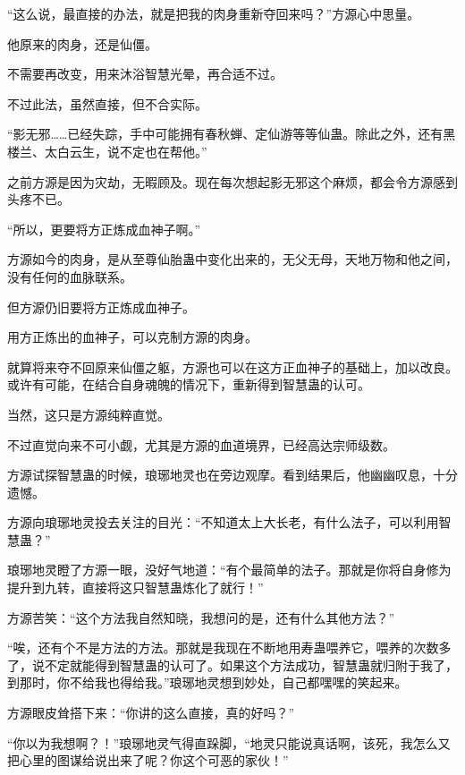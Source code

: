\begin{this_body}
“这么说，最直接的办法，就是把我的肉身重新夺回来吗？”方源心中思量。

他原来的肉身，还是仙僵。

不需要再改变，用来沐浴智慧光晕，再合适不过。

不过此法，虽然直接，但不合实际。

“影无邪……已经失踪，手中可能拥有春秋蝉、定仙游等等仙蛊。除此之外，还有黑楼兰、太白云生，说不定也在帮他。”

之前方源是因为灾劫，无暇顾及。现在每次想起影无邪这个麻烦，都会令方源感到头疼不已。

“所以，更要将方正炼成血神子啊。”

方源如今的肉身，是从至尊仙胎蛊中变化出来的，无父无母，天地万物和他之间，没有任何的血脉联系。

但方源仍旧要将方正炼成血神子。

用方正炼出的血神子，可以克制方源的肉身。

就算将来夺不回原来仙僵之躯，方源也可以在这方正血神子的基础上，加以改良。或许有可能，在结合自身魂魄的情况下，重新得到智慧蛊的认可。

当然，这只是方源纯粹直觉。

不过直觉向来不可小觑，尤其是方源的血道境界，已经高达宗师级数。

方源试探智慧蛊的时候，琅琊地灵也在旁边观摩。看到结果后，他幽幽叹息，十分遗憾。

方源向琅琊地灵投去关注的目光：“不知道太上大长老，有什么法子，可以利用智慧蛊？”

琅琊地灵瞪了方源一眼，没好气地道：“有个最简单的法子。那就是你将自身修为提升到九转，直接将这只智慧蛊炼化了就行！”

方源苦笑：“这个方法我自然知晓，我想问的是，还有什么其他方法？”

“唉，还有个不是方法的方法。那就是我现在不断地用寿蛊喂养它，喂养的次数多了，说不定就能得到智慧蛊的认可了。如果这个方法成功，智慧蛊就归附于我了，到那时，你不给我也得给我。”琅琊地灵想到妙处，自己都嘿嘿的笑起来。

方源眼皮耸搭下来：“你讲的这么直接，真的好吗？”

“你以为我想啊？！”琅琊地灵气得直跺脚，“地灵只能说真话啊，该死，我怎么又把心里的图谋给说出来了呢？你这个可恶的家伙！”

\end{this_body}


